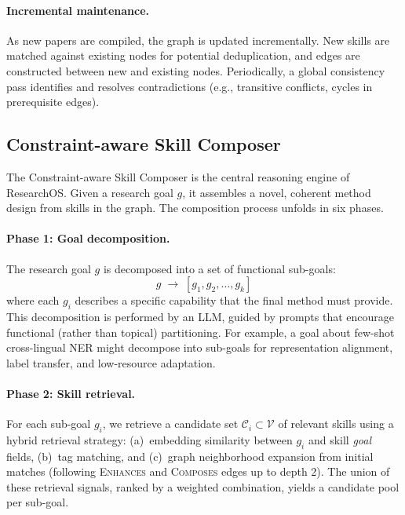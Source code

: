 \paragraph{Incremental maintenance.} As new papers are compiled, the graph is updated incrementally. New skills are matched against existing nodes for potential deduplication, and edges are constructed between new and existing nodes. Periodically, a global consistency pass identifies and resolves contradictions (e.g., transitive conflicts, cycles in prerequisite edges).

\subsection{Constraint-aware Skill Composer}
\label{sec:composer}

The Constraint-aware Skill Composer is the central reasoning engine of ResearchOS. Given a research goal $g$, it assembles a novel, coherent method design from skills in the graph. The composition process unfolds in six phases.

\paragraph{Phase 1: Goal decomposition.}
The research goal $g$ is decomposed into a set of functional sub-goals:
\begin{equation}
\label{eq:goal_decomp}
g \;\longrightarrow\; [g_1, g_2, \ldots, g_k]
\end{equation}
where each $g_i$ describes a specific capability that the final method must provide. This decomposition is performed by an LLM, guided by prompts that encourage functional (rather than topical) partitioning. For example, a goal about few-shot cross-lingual NER might decompose into sub-goals for representation alignment, label transfer, and low-resource adaptation.

\paragraph{Phase 2: Skill retrieval.}
For each sub-goal $g_i$, we retrieve a candidate set $\mathcal{C}_i \subset \mathcal{V}$ of relevant skills using a hybrid retrieval strategy: (a)~embedding similarity between $g_i$ and skill \emph{goal} fields, (b)~tag matching, and (c)~graph neighborhood expansion from initial matches (following \textsc{Enhances} and \textsc{Composes} edges up to depth 2). The union of these retrieval signals, ranked by a weighted combination, yields a candidate pool per sub-goal.

